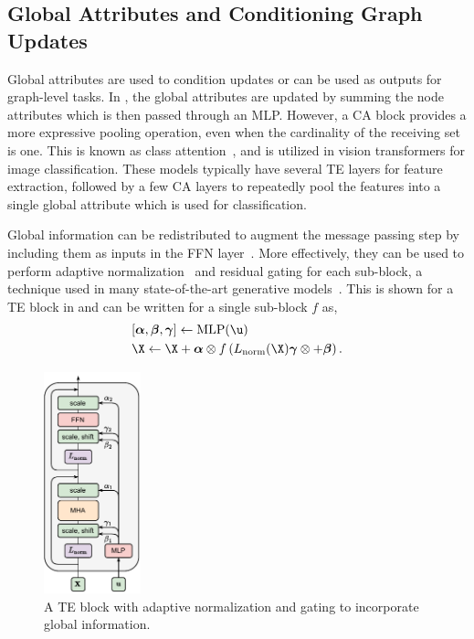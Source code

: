 \subsection{Global Attributes and Conditioning Graph Updates}
\label{sec:global_attributes}

Global attributes are used to condition updates or can be used as outputs for graph-level tasks.
In , the global attributes are updated by summing the node attributes which is then passed through an MLP\@.
However, a CA block provides a more expressive pooling operation, even when the cardinality of the receiving set is one.
This is known as class attention~\cite{GoingDeeper}, and is utilized in vision transformers for image classification.
These models typically have several TE layers for feature extraction, followed by a few CA layers to repeatedly pool the features into a single global attribute which is used for classification.

Global information can be redistributed to augment the message passing step by including them as inputs in the FFN layer~\cite{PCJeDiDiffusionParticle}.
More effectively, they can be used to perform adaptive normalization~\cite{FiLMVisualReasoning} and residual gating for each sub-block, a technique used in many state-of-the-art generative models~\cite{SD3, DIT, flux2024github}.
This is shown for a TE block in  and can be written for a single sub-block $f$ as,
\begin{equation}
    \begin{aligned}
    & [\boldsymbol{\alpha}, \boldsymbol{\beta}, \boldsymbol{\gamma}] \leftarrow \text{MLP}(\u) \\
    & \X \leftarrow \X + \boldsymbol{\alpha} \otimes f \left(L_\text{norm}(\X)\boldsymbol{\gamma} \otimes  + \boldsymbol{\beta}\right).
    \end{aligned}
\end{equation}

\begin{figure}
    \centering
    \includegraphics[width=0.25\textwidth]{Figures/graph_networks/adaptivegating.pdf}
    \caption{A TE block with adaptive normalization and gating to incorporate global information.}
    \label{fig:adaptive_gating}
\end{figure}
